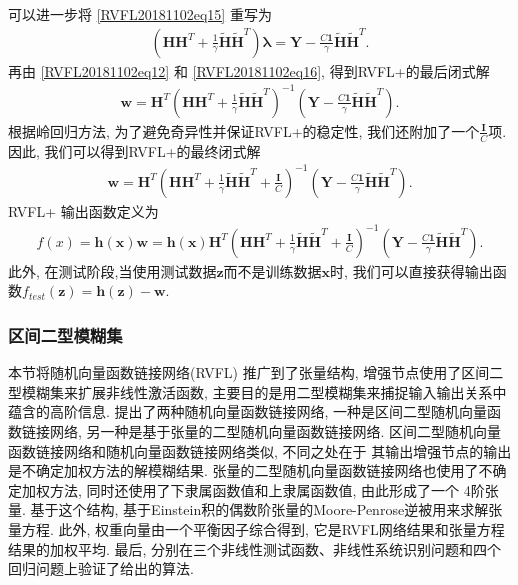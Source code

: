 可以进一步将 \eqref{RVFL20181102eq15} 重写为
\begin{align}
    \left(\bm H \bm H^T  + \frac 1 \gamma \tilde{\bm H} \tilde{\bm H}^T \right )\bm \lambda  = \bm Y - \frac {C \bm 1} {\gamma}\tilde{\bm H} \tilde{\bm H}^T.  \label{RVFL20181102eq16}
\end{align}
再由 \eqref{RVFL20181102eq12} 和 \eqref{RVFL20181102eq16}, 得到RVFL+的最后闭式解
\begin{align}
    \bm  w =\bm H^T \left(\bm H \bm H^T  + \frac 1 \gamma \tilde{\bm H} \tilde{\bm H}^T \right )^{-1} \left(\bm Y - \frac {C \bm 1} {\gamma}\tilde{\bm H} \tilde{\bm H}^T \right ). \label{RVFL20181102eq17}
\end{align}
根据岭回归方法\cite{Bishop2012-6469}, 为了避免奇异性并保证RVFL+的稳定性, 我们还附加了一个$\frac{\bm I}C$项. 因此, 我们可以得到RVFL+的最终闭式解
\begin{align}
    \bm w = \bm H^T \left(\bm H \bm H^T  + \frac 1 \gamma \tilde{\bm H} \tilde{\bm H}^T +\frac{ \bm I} C \right)^{-1} \left(\bm Y -\frac {C \bm 1} {\gamma}\tilde{\bm H} \tilde{\bm H}^T \right ).
\label{RVFL20181102eq18}
\end{align}
RVFL+ 输出函数定义为
\begin{align}
    f(x) =\bm  h (\bm x)\bm w =\bm h(\bm  x)\bm H^ T \left(\bm H \bm H^T  +\frac 1 \gamma\tilde{\bm H} \tilde{\bm H}^T  +\frac{\bm  I} C \right)^{-1}\left(\bm Y - \frac {C \bm 1} {\gamma}\tilde{\bm H} \tilde{\bm H}^T \right).
\end{align}
此外, 在测试阶段,当使用测试数据$\bm z$而不是训练数据$\bm x$时, 我们可以直接获得输出函数$f_{test}(\bm z)=\bm h(\bm z)-\bm w$.
\subsubsection{区间二型模糊集}
本节将随机向量函数链接网络(RVFL) 推广到了张量结构,  增强节点使用了区间二型模糊集来扩展非线性激活函数, 主要目的是用二型模糊集来捕捉输入输出关系中蕴含的高阶信息.
提出了两种随机向量函数链接网络, 一种是区间二型随机向量函数链接网络, 另一种是基于张量的二型随机向量函数链接网络.
区间二型随机向量函数链接网络和随机向量函数链接网络类似, 不同之处在于 其输出增强节点的输出是不确定加权方法的解模糊结果.
张量的二型随机向量函数链接网络也使用了不确定加权方法, 同时还使用了下隶属函数值和上隶属函数值, 由此形成了一个 4阶张量.
基于这个结构, 基于Einstein积的偶数阶张量的Moore-Penrose逆被用来求解张量方程.
此外, 权重向量由一个平衡因子综合得到, 它是RVFL网络结果和张量方程结果的加权平均.
最后, 分别在三个非线性测试函数、非线性系统识别问题和四个回归问题上验证了给出的算法.

